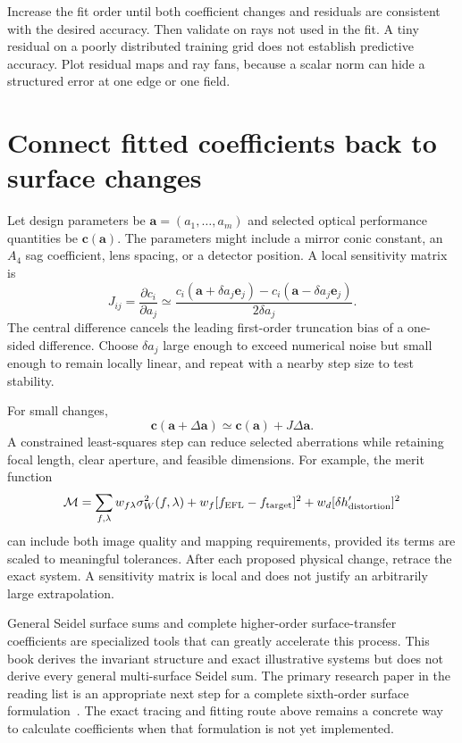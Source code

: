 Increase the fit order until both coefficient changes and residuals are
consistent with the desired accuracy. Then validate on rays not used in the
fit. A tiny residual on a poorly distributed training grid does not establish
predictive accuracy. Plot residual maps and ray fans, because a scalar norm
can hide a structured error at one edge or one field.

\section{Connect fitted coefficients back to surface changes}
Let design parameters be $\bm a=(a_1,\ldots,a_m)$ and selected optical
performance quantities be $\bm c(\bm a)$. The parameters might include a
mirror conic constant, an $A_4$ sag coefficient, lens spacing, or a detector
position. A local sensitivity matrix is
\begin{equation}
 J_{ij}=\frac{\partial c_i}{\partial a_j}
   \simeq\frac{c_i(\bm a+\delta a_j\bm e_j)
                  -c_i(\bm a-\delta a_j\bm e_j)}{2\delta a_j}.
\end{equation}
The central difference cancels the leading first-order truncation bias of a
one-sided difference. Choose $\delta a_j$ large enough to exceed numerical
noise but small enough to remain locally linear, and repeat with a nearby
step size to test stability.

For small changes,
\begin{equation}\bm c(\bm a+\Delta\bm a)\simeq\bm c(\bm a)+J\Delta\bm a.\end{equation}
A constrained least-squares step can reduce selected aberrations while
retaining focal length, clear aperture, and feasible dimensions. For example,
the merit function
\begin{equation}
 \mathcal M=\sum_{f,\lambda}w_{f\lambda}\sigma_W^2(f,\lambda)
  +w_f[f_{\rm EFL}-f_{\rm target}]^2
  +w_d[\delta h'_{\rm distortion}]^2
\end{equation}
can include both image quality and mapping requirements, provided its terms
are scaled to meaningful tolerances. After each proposed physical change,
retrace the exact system. A sensitivity matrix is local and does not justify
an arbitrarily large extrapolation.

General Seidel surface sums and complete higher-order surface-transfer
coefficients are specialized tools that can greatly accelerate this process.
This book derives the invariant structure and exact illustrative systems but
does not derive every general multi-surface Seidel sum. The primary research
paper in the reading list is an appropriate next step for a complete
sixth-order surface formulation~\cite{sas2010}. The exact tracing and fitting
route above remains a concrete way to calculate coefficients when that
formulation is not yet implemented.

